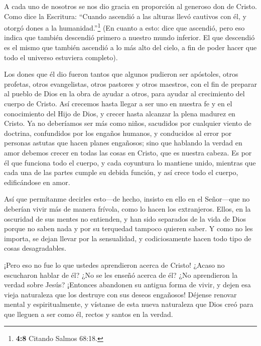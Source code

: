  A cada uno de nosotros se nos dio gracia en proporción al
generoso don de Cristo.  Como dice la Escritura: ``Cuando
ascendió a las alturas llevó cautivos con él, y otorgó dones a la
humanidad.''\footnote{\textbf{4:8} Citando Salmos 68:18.} 
(En cuanto a esto: dice que ascendió, pero eso indica que también
descendió primero a nuestro mundo inferior.  El que
descendió es el mismo que también ascendió a lo más alto del cielo, a
fin de poder hacer que todo el universo estuviera completo).

 Los dones que él dio fueron tantos que algunos pudieron
ser apóstoles, otros profetas, otros evangelistas, otros pastores y
otros maestros,  con el fin de preparar al pueblo de Dios
en la obra de ayudar a otros, para ayudar al crecimiento del cuerpo de
Cristo.  Así crecemos hasta llegar a ser uno en nuestra fe
y en el conocimiento del Hijo de Dios, y crecer hasta alcanzar la plena
madurez en Cristo.  Ya no deberíamos ser más como niños,
sacudidos por cualquier viento de doctrina, confundidos por los engaños
humanos, y conducidos al error por personas astutas que hacen planes
engañosos;  sino que hablando la verdad en amor debemos
crecer en todas las cosas en Cristo, que es nuestra cabeza.
 Es por él que funciona todo el cuerpo, y cada coyuntura lo
mantiene unido, mientras que cada una de las partes cumple su debida
función, y así crece todo el cuerpo, edificándose en amor.

 Así que permítanme decirles esto---de hecho, insisto en
ello en el Señor---que no deberían vivir más de manera frívola, como lo
hacen los extranjeros.  Ellos, en la oscuridad de sus
mentes no entienden, y han sido separados de la vida de Dios porque no
saben nada y por su terquedad tampoco quieren saber.  Y
como no les importa, se dejan llevar por la sensualidad, y
codiciosamente hacen todo tipo de cosas desagradables.

 ¡Pero eso no fue lo que ustedes aprendieron acerca de
Cristo!  ¿Acaso no escucharon hablar de él? ¿No se les
enseñó acerca de él? ¿No aprendieron la verdad sobre Jesús?
 ¡Entonces abandonen su antigua forma de vivir, y dejen esa
vieja naturaleza que los destruye con sus deseos engañosos!
 Déjense renovar mental y espiritualmente,  y
vístanse de esta nueva naturaleza que Dios creó para que lleguen a ser
como él, rectos y santos en la verdad.

